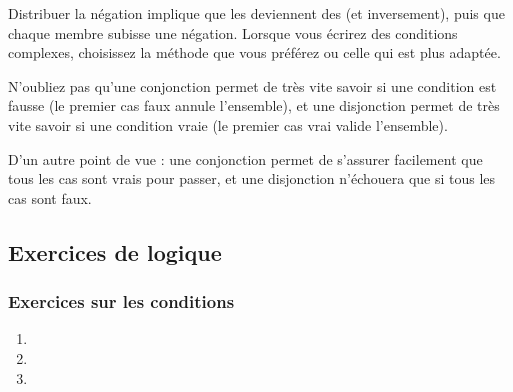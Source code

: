 \documentclass[11pt,a4paper]{article}
\begin{document}
Distribuer la négation implique que les  deviennent des  (et inversement), puis que chaque membre subisse une négation.
Lorsque vous écrirez des conditions complexes, choisissez la méthode que vous préférez ou celle qui est plus adaptée.

\medskip

N'oubliez pas qu'une conjonction permet de très vite savoir si une condition est fausse (le premier cas faux annule l'ensemble), et une disjonction permet de très vite savoir si une condition vraie (le premier cas vrai valide l'ensemble).

\medskip

D'un autre point de vue : une conjonction permet de s'assurer facilement que tous les cas sont vrais pour passer, et une disjonction n'échouera que si tous les cas sont faux.


\bigskip


\subsection{Exercices de logique}

\subsubsection{Exercices sur les conditions}


\medskip


\begin{enumerate}[label=\alph*.]
\item {}
\item {}
\item {}
\end{enumerate}
\end{document}
